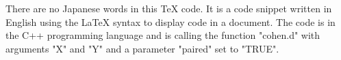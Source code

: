 There are no Japanese words in this TeX code. It is a code snippet written in English using the LaTeX syntax to display code in a document. The code is in the C++ programming language and is calling the function "cohen.d" with arguments "X" and "Y" and a parameter "paired" set to "TRUE".
